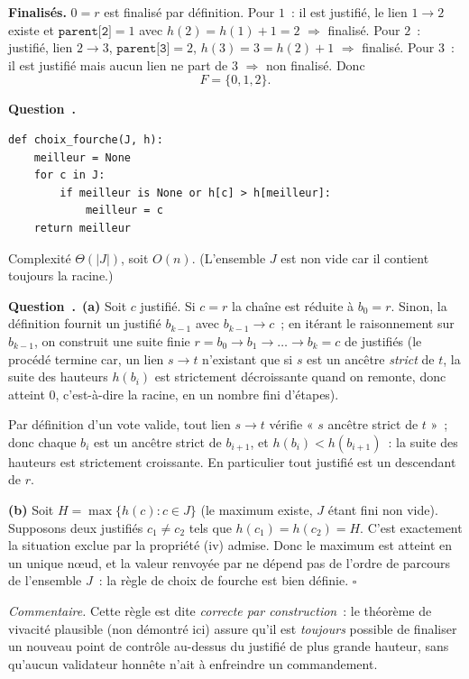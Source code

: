 \documentclass[11pt,a4paper]{article}
\renewcommand{\Q}{\medskip\par\stepcounter{qcnt}\noindent\textbf{\color{cnc}Question~\theqcnt.}~}
\begin{document}
\textbf{Finalisés.} $0=r$ est finalisé par définition. Pour $1$~: il est justifié, le lien
$1\to 2$ existe et $\texttt{parent[2]}=1$ avec $h(2)=h(1)+1=2$ $\Rightarrow$ finalisé. Pour
$2$~: justifié, lien $2\to 3$, $\texttt{parent[3]}=2$, $h(3)=3=h(2)+1$ $\Rightarrow$
finalisé. Pour $3$~: il est justifié mais aucun lien ne part de $3$ $\Rightarrow$ non
finalisé. Donc
\[ F=\{0,1,2\}. \]

\Q
\begin{lstlisting}
def choix_fourche(J, h):
    meilleur = None
    for c in J:
        if meilleur is None or h[c] > h[meilleur]:
            meilleur = c
    return meilleur
\end{lstlisting}
Complexité $\Theta(|J|)$, soit $O(n)$. (L'ensemble $J$ est non vide car il contient toujours
la racine.)

\Q \textbf{(a)} Soit $c$ justifié. Si $c=r$ la chaîne est réduite à $b_0=r$. Sinon, la
définition fournit un justifié $b_{k-1}$ avec $b_{k-1}\to c$~; en itérant le raisonnement sur
$b_{k-1}$, on construit une suite finie $r=b_0\to b_1\to\dots\to b_k=c$ de justifiés (le
procédé termine car, un lien $s\to t$ n'existant que si $s$ est un ancêtre \emph{strict} de
$t$, la suite des hauteurs $h(b_i)$ est strictement décroissante quand on remonte, donc
atteint $0$, c'est-à-dire la racine, en un nombre fini d'étapes).

Par définition d'un vote valide, tout lien $s\to t$ vérifie « $s$ ancêtre strict de $t$ »~;
donc chaque $b_i$ est un ancêtre strict de $b_{i+1}$, et $h(b_i)<h(b_{i+1})$~: la suite des
hauteurs est strictement croissante. En particulier tout justifié est un descendant de $r$.

\textbf{(b)} Soit $H=\max\{h(c) : c\in J\}$ (le maximum existe, $J$ étant fini non vide).
Supposons deux justifiés $c_1\ne c_2$ tels que $h(c_1)=h(c_2)=H$. C'est exactement la
situation exclue par la propriété (iv) admise. Donc le maximum est atteint en un unique
n\oe ud, et la valeur renvoyée par  ne dépend pas de l'ordre de parcours
de l'ensemble $J$~: la règle de choix de fourche est bien définie. \hfill$\square$

\emph{Commentaire.} Cette règle est dite \emph{correcte par construction}~: le théorème de
vivacité plausible (non démontré ici) assure qu'il est \emph{toujours} possible de finaliser
un nouveau point de contrôle au-dessus du justifié de plus grande hauteur, sans qu'aucun
validateur honnête n'ait à enfreindre un commandement.

\end{document}
